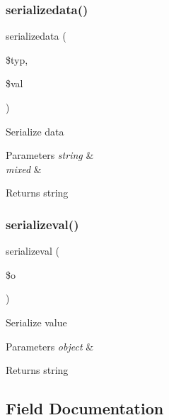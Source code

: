 \subsubsection{\texorpdfstring{serializedata()}{serializedata()}}
{\footnotesize\ttfamily serializedata (\begin{DoxyParamCaption}\item[{}]{\$typ,  }\item[{}]{\$val }\end{DoxyParamCaption})}

Serialize data


\begin{DoxyParams}{Parameters}
{\em string} & \\
\hline
{\em mixed} & \\
\hline
\end{DoxyParams}
\begin{DoxyReturn}{Returns}
string 
\end{DoxyReturn}
\mbox{\label{class_x_m_l___r_p_c___values_a1a4bfc79985c185745d96ebe3a1e5c3d}} 
\subsubsection{\texorpdfstring{serializeval()}{serializeval()}}
{\footnotesize\ttfamily serializeval (\begin{DoxyParamCaption}\item[{}]{\$o }\end{DoxyParamCaption})}

Serialize value


\begin{DoxyParams}{Parameters}
{\em object} & \\
\hline
\end{DoxyParams}
\begin{DoxyReturn}{Returns}
string 
\end{DoxyReturn}


\subsection{Field Documentation}
\mbox{\label{class_x_m_l___r_p_c___values_ad856a60cee1894f180e845f9b7b81458}} 
